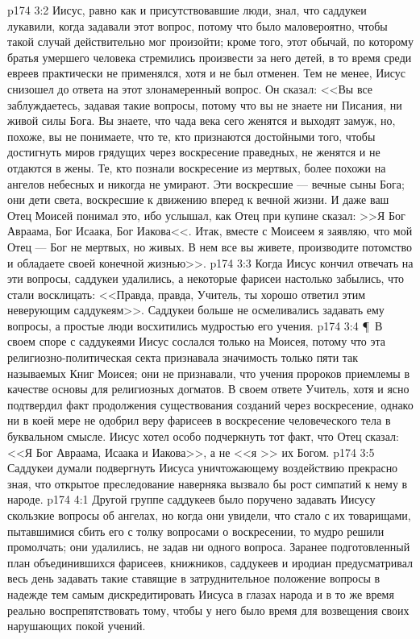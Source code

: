 \vs p174 3:2 Иисус, равно как и присутствовавшие люди, знал, что саддукеи лукавили, когда задавали этот вопрос, потому что было маловероятно, чтобы такой случай действительно мог произойти; кроме того, этот обычай, по которому братья умершего человека стремились произвести за него детей, в то время среди евреев практически не применялся, хотя и не был отменен. Тем не менее, Иисус снизошел до ответа на этот злонамеренный вопрос. Он сказал: <<Вы все заблуждаетесь, задавая такие вопросы, потому что вы не знаете ни Писания, ни живой силы Бога. Вы знаете, что чада века сего женятся и выходят замуж, но, похоже, вы не понимаете, что те, кто признаются достойными того, чтобы достигнуть миров грядущих через воскресение праведных, не женятся и не отдаются в жены. Те, кто познали воскресение из мертвых, более похожи на ангелов небесных и никогда не умирают. Эти воскресшие --- вечные сыны Бога; они дети света, воскресшие к движению вперед к вечной жизни. И даже ваш Отец Моисей понимал это, ибо услышал, как Отец при купине сказал: >>Я  Бог Авраама, Бог Исаака, Бог Иакова<<. Итак, вместе с Моисеем я заявляю, что мой Отец --- Бог не мертвых, но живых. В нем все вы живете, производите потомство и обладаете своей конечной жизнью>>.
\vs p174 3:3 Когда Иисус кончил отвечать на эти вопросы, саддукеи удалились, а некоторые фарисеи настолько забылись, что стали восклицать: <<Правда, правда, Учитель, ты хорошо ответил этим неверующим саддукеям>>. Саддукеи больше не осмеливались задавать ему вопросы, а простые люди восхитились мудростью его учения.
\vs p174 3:4 \P\ В своем споре с саддукеями Иисус сослался только на Моисея, потому что эта религиозно\hyp{}политическая секта признавала значимость только пяти так называемых Книг Моисея; они не признавали, что учения пророков приемлемы в качестве основы для религиозных догматов. В своем ответе Учитель, хотя и ясно подтвердил факт продолжения существования созданий через воскресение, однако ни в коей мере не одобрил веру фарисеев в воскресение человеческого тела в буквальном смысле. Иисус хотел особо подчеркнуть тот факт, что Отец сказал: <<Я  Бог Авраама, Исаака и Иакова>>, а не <<я >> их Богом.
\vs p174 3:5 Саддукеи думали подвергнуть Иисуса уничтожающему воздействию  прекрасно зная, что открытое преследование наверняка вызвало бы рост симпатий к нему в народе.
\vs p174 4:1 Другой группе саддукеев было поручено задавать Иисусу скользкие вопросы об ангелах, но когда они увидели, что стало с их товарищами, пытавшимися сбить его с толку вопросами о воскресении, то мудро решили промолчать; они удалились, не задав ни одного вопроса. Заранее подготовленный план объединившихся фарисеев, книжников, саддукеев и иродиан предусматривал весь день задавать такие ставящие в затруднительное положение вопросы в надежде тем самым дискредитировать Иисуса в глазах народа и в то же время реально воспрепятствовать тому, чтобы у него было время для возвещения своих нарушающих покой учений.
